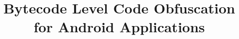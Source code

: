 \documentclass{sig-alternate-05-2015}
\newcommand\FIXME[1]{\textcolor{red}{FIX:}\textcolor{red}{#1}}
\newcommand{\ToolName}{\textsc{DexPro}\xspace}
\begin{document}
\title{Bytecode Level Code Obfuscation for Android Applications}
\author{}

\maketitle

\begin{abstract}



\end{abstract}
\end{document}
